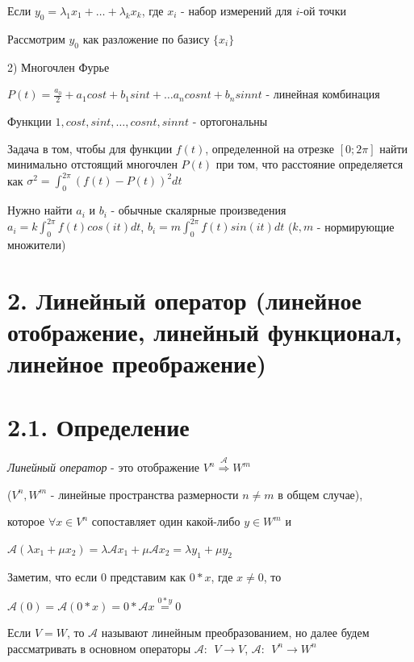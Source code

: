 \documentclass[12pt]{article}
\begin{document}
    Если $y_0 = \lambda_1 x_1 + \dots + \lambda_k x_k$, где $x_i$ - набор измерений для $i$-ой точки

    Рассмотрим $y_0$ как разложение по базису $\{x_i\}$

    \vspace{5mm}

    2) Многочлен Фурье

    $P(t) = \frac{a_0}{2} + a_1 cos t + b_1 sin t + \dots a_n cos nt + b_n sin nt$ - линейная комбинация

    Функции ${1, cos t, sin t, \dots, cos nt, sin nt}$ - ортогональны

    Задача в том, чтобы для функции $f(t)$, определенной на отрезке $[0;2\pi]$ найти минимально отстоящий многочлен $P(t)$ при том,
    что расстояние определяется как $\displaystyle \sigma^2 = \int_0^{2\pi} (f(t) - P(t))^2 dt$

    Нужно найти $a_i$ и $b_i$ - обычные скалярные произведения $\displaystyle a_i = k \int_0^{2\pi} f(t) cos(it) dt$, $\displaystyle b_i = m \int_0^{2\pi} f(t) sin(it) dt$ ($k, m$ - нормирующие множители)

    \clearpage

    \section{2. Линейный оператор (линейное отображение, линейный функционал, линейное преображение)}

    \section{2.1. Определение}

    \textit{Линейный оператор} - это отображение $V^n \stackrel{\mathcal{A}}{\Longrightarrow} W^m$

    ($V^n, W^m$ - линейные пространства размерности $n \neq m$ в общем случае),

    которое $\forall x \in V^n$ сопоставляет один какой-либо $y \in W^m$ и

    $\mathcal{A} (\lambda x_1 + \mu x_2) = \lambda \mathcal{A} x_1 + \mu \mathcal{A} x_2 = \lambda y_1 + \mu y_2$

    \Nota Заметим, что если 0 представим как $0 * x$, где $x \neq 0$, то

    $\mathcal{A}(0) = \mathcal{A}(0 * x) = 0 * \mathcal{A}x \stackrel{0 * y}{=} 0$

    \Nota Если $V = W$, то $\mathcal{A}$ называют линейным преобразованием, но далее будем рассматривать в основном операторы $\mathcal{A}: \ \ V \rightarrow V$, $\mathcal{A}: \ \ V^n \rightarrow W^n$
\end{document}
